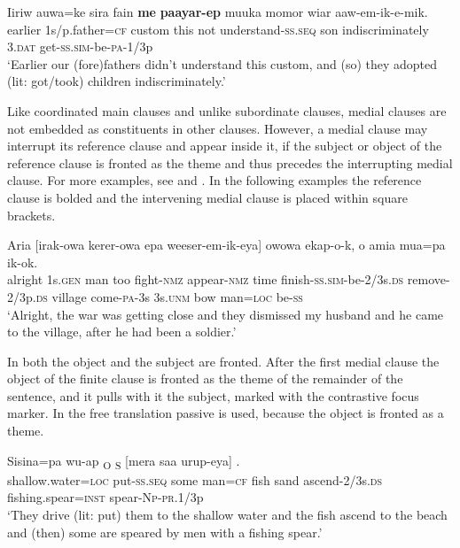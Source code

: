 \ea%
\label{ex:8:x1448}
\gll Iiriw  auwa=ke  sira  fain  \textbf{me}  \textbf{paayar-ep} muuka  momor  wiar  aaw-em-ik-e-mik.\\
earlier  1s/p.father=\textsc{cf} custom  this  not  understand-\textsc{ss}.\textsc{seq} son indiscriminately 3.\textsc{dat} get-\textsc{ss}.\textsc{sim}-be-\textsc{pa}-1/3p\\
\glt`Earlier our (fore)fathers didn't understand this custom, and (so) they adopted (lit: got/took) children indiscriminately.'
\z


Like coordinated main clauses and unlike subordinate clauses, medial clauses are not embedded as constituents in other clauses. However, a medial clause may interrupt its reference clause and appear inside it, if the subject or object  of the reference clause is fronted as the theme and thus precedes the interrupting medial clause. For more examples, see  and . In the following examples the reference clause is bolded and the intervening medial clause is placed within square brackets.

\ea%
\label{ex:8:x1464}
\gll Aria       [irak-owa  kerer-owa  epa weeser-em-ik-eya]    owowa  ekap-o-k, o  amia  mua=pa  ik-ok.\\
alright  1s.\textsc{gen} man  too  fight-\textsc{nmz} appear-\textsc{nmz} time finish-\textsc{ss}.\textsc{sim}-be-2/3s.\textsc{ds} remove-2/3p.\textsc{ds} village come-\textsc{pa}-3s 3s.\textsc{unm} bow man=\textsc{loc} be-\textsc{ss}\\
\glt`Alright, the war was getting close and they dismissed my husband and he came to the village, after he had been a soldier.'
\z


In  both the object and the subject are fronted. After the first medial clause the object of the finite clause is fronted as the theme of the remainder of the sentence, and it pulls with it the subject, marked with the contrastive focus marker.  In the free translation passive is used, because the object is fronted as a theme.

\ea%
\label{ex:8:x1465}
\gll Sisina=pa  wu-ap  \textsubscript{O}  \textsubscript{S}  [mera  saa urup-eya]    . \\
shallow.water=\textsc{loc} put-\textsc{ss}.\textsc{seq} some man=\textsc{cf} fish sand ascend-2/3s.\textsc{ds} fishing.spear=\textsc{inst} spear-\textsc{Np}-\textsc{pr}.1/3p\\
\glt`They drive (lit: put) them to the shallow water and the fish ascend to the beach and (then) some are speared by men with a fishing spear.'
\z


